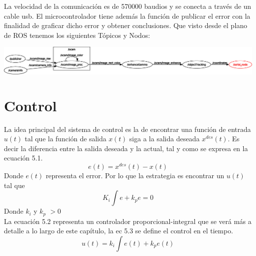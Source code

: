 La velocidad de la comunicación es de 570000 baudios y se conecta a través de un cable usb. El microcontrolador tiene además
la función de publicar el error con la finalidad de graficar dicho error y obtener conclusiones. Que visto desde el plano
de ROS tenemos los siguientes Tópicos y Nodos:
\begin{center}
	\includegraphics[width=1.0\textwidth]{Contenido/Cuerpo/Capitulo5/Fig3.eps}
	\label{Fig4}
\end{center}




\section{Control}
La idea principal del sistema de control es la de encontrar una función de entrada $u(t)$ tal que la función de salida $x(t)$ siga a la
salida deseada $x^{des}(t)$. Es decir la diferencia entre la salida deseada y la actual, tal y como se expresa en la ecuación 5.1.
\begin{equation}
	e(t) = x^{des}(t) - x(t)
\end{equation}
Donde $e(t)$ representa el error. Por lo que la estrategia es encontrar un $u(t)$ tal que
\begin{equation}
	K_i\int e + k_pe = 0
\end{equation}
Donde $k_i$ y $k_p$ $> 0$\\
La ecuación 5.2 representa un controlador proporcional-integral que se verá más a detalle a lo largo de este capítulo, la ec 5.3 se define el control en el tiempo.
\begin{equation}
	u(t) = k_i\int{e}(t) + k_pe(t)
\end{equation}

